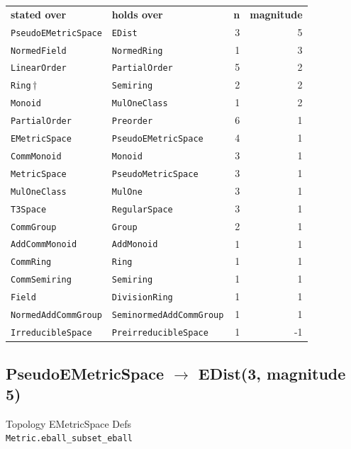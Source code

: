 \documentclass[10pt,a4paper]{article}
\begin{document}
\begin{center}
\begin{tabular}{llrr}
\textbf{stated over} & \textbf{holds over} & \textbf{n} & \textbf{magnitude}\\[2pt]
\texttt{\small PseudoEMetricSpace} & \texttt{\small EDist} & 3 & 5\\
\texttt{\small NormedField} & \texttt{\small NormedRing} & 1 & 3\\
\texttt{\small LinearOrder} & \texttt{\small PartialOrder} & 5 & 2\\
\texttt{\small Ring}\,$\dagger$ & \texttt{\small Semiring} & 2 & 2\\
\texttt{\small Monoid} & \texttt{\small MulOneClass} & 1 & 2\\
\texttt{\small PartialOrder} & \texttt{\small Preorder} & 6 & 1\\
\texttt{\small EMetricSpace} & \texttt{\small PseudoEMetricSpace} & 4 & 1\\
\texttt{\small CommMonoid} & \texttt{\small Monoid} & 3 & 1\\
\texttt{\small MetricSpace} & \texttt{\small PseudoMetricSpace} & 3 & 1\\
\texttt{\small MulOneClass} & \texttt{\small MulOne} & 3 & 1\\
\texttt{\small T3Space} & \texttt{\small RegularSpace} & 3 & 1\\
\texttt{\small CommGroup} & \texttt{\small Group} & 2 & 1\\
\texttt{\small AddCommMonoid} & \texttt{\small AddMonoid} & 1 & 1\\
\texttt{\small CommRing} & \texttt{\small Ring} & 1 & 1\\
\texttt{\small CommSemiring} & \texttt{\small Semiring} & 1 & 1\\
\texttt{\small Field} & \texttt{\small DivisionRing} & 1 & 1\\
\texttt{\small NormedAddCommGroup} & \texttt{\small SeminormedAddCommGroup} & 1 & 1\\
\texttt{\small IrreducibleSpace} & \texttt{\small PreirreducibleSpace} & 1 & -1\\
\end{tabular}
\end{center}

\subsection*{PseudoEMetricSpace $\to$ EDist\quad\textmd{\small (3, magnitude 5)}}
{\footnotesize\color{locator}Topology\,\textperiodcentered\,EMetricSpace\,\textperiodcentered\,Defs}\\
\hspace*{1em}\texttt{\small Metric.\allowbreak{}eball\_subset\_eball}\\
\end{document}

